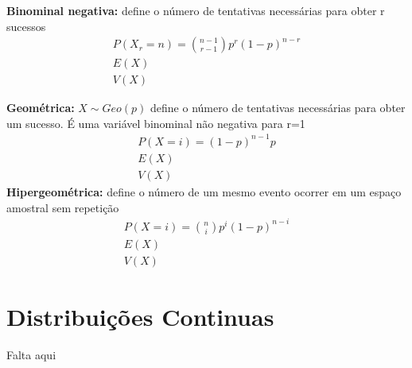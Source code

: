 \documentclass[10pt]{article}
\begin{document}
\begin{multicols*}{2}
\textbf{Binominal negativa:} define o número de tentativas necessárias para 
obter r sucessos
\begin{gather*}
    P(X_r = n) = \binom{n-1}{r-1} p^r (1-p)^{n-r}
    \\
    E(X)
    \\
    V(X)
\end{gather*}

\textbf{Geométrica:} $ X\sim Geo(p) $ define o número de tentativas necessárias 
para obter um sucesso. É uma variável binominal não negativa para r=1
\begin{gather*}
   P(X = i) = (1-p)^{n-1}p
   \\
   E(X)
   \\
   V(X)
\end{gather*}
\textbf{Hipergeométrica:} define o número de um mesmo evento ocorrer em um espaço
amostral sem repetição
\begin{gather*}
   P(X = i) = \binom{n}{i}p^{i}(1-p)^{n-i}
   \\
   E(X)
   \\
   V(X)
\end{gather*}

\section{Distribuições Continuas}
Falta aqui 

\end{multicols*}
\end{document}
